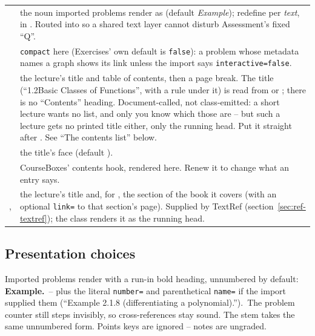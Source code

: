 \begin{center}
\begin{tabularx}{\linewidth}{@{}l Y@{}}
 & the noun imported problems render as
  (default \emph{Example}); redefine per \emph{text}, in
  . Routed into  so a
  shared text layer cannot disturb Assessment's fixed ``Q''.\\
 & \texttt{compact} here (Exercises'
  own default is \texttt{false}): a problem whose metadata names a graph
  shows its link unless the import says \texttt{interactive=false}.\\
 & the lecture's title and table of contents, then a page
  break. The title (``1.2\quad Basic Classes of Functions'', with a rule
  under it) is read from  or ; there is no
  ``Contents'' heading. Document-called, not class-emitted: a short lecture
  wants no list, and only you know which those are -- but such a lecture
  gets no printed title either, only the running head. Put it straight
  after . See ``The contents list'' below.\\
 & the title's face (default
  ).\\
 & CourseBoxes' contents hook, rendered here. Renew it
  to change what an entry says.\\
,  & the lecture's title and, for
  , the section of the book it covers (with an optional
  \texttt{link=} to that section's page). Supplied by TextRef
  (section~\ref{sec:ref-textref}); the class renders it as the running
  head.\\
\end{tabularx}
\end{center}

\subsection*{Presentation choices}

Imported problems render with a run-in bold heading, unnumbered by default:
\textbf{Example.}\ -- plus the literal \texttt{number=} and parenthetical
\texttt{name=} if the import supplied them (``Example 2.1.8
(differentiating a polynomial).'').\ The problem counter still steps invisibly, so cross-references
stay sound. The  stem takes the same unnumbered form.
Points keys are ignored -- notes are ungraded.

